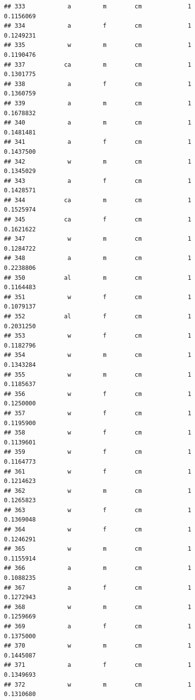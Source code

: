 \documentclass[]{article}
\begin{document}
\begin{verbatim}
## 333            a         m        cm             1          0.1156069
## 334            a         f        cm             1          0.1249231
## 335            w         m        cm             1          0.1190476
## 337           ca         m        cm             1          0.1301775
## 338            a         f        cm             1          0.1360759
## 339            a         m        cm             1          0.1678832
## 340            a         m        cm             1          0.1481481
## 341            a         f        cm             1          0.1437500
## 342            w         m        cm             1          0.1345029
## 343            a         f        cm             1          0.1428571
## 344           ca         m        cm             1          0.1525974
## 345           ca         f        cm             1          0.1621622
## 347            w         m        cm             1          0.1284722
## 348            a         m        cm             1          0.2238806
## 350           al         m        cm             1          0.1164483
## 351            w         f        cm             1          0.1079137
## 352           al         f        cm             1          0.2031250
## 353            w         f        cm             1          0.1182796
## 354            w         m        cm             1          0.1343284
## 355            w         m        cm             1          0.1185637
## 356            w         f        cm             1          0.1250000
## 357            w         f        cm             1          0.1195900
## 358            w         f        cm             1          0.1139601
## 359            w         f        cm             1          0.1164773
## 361            w         f        cm             1          0.1214623
## 362            w         m        cm             1          0.1265823
## 363            w         f        cm             1          0.1369048
## 364            w         f        cm             1          0.1246291
## 365            w         m        cm             1          0.1155914
## 366            a         m        cm             1          0.1088235
## 367            a         f        cm             1          0.1272943
## 368            w         m        cm             1          0.1259669
## 369            a         f        cm             1          0.1375000
## 370            w         m        cm             1          0.1445087
## 371            a         f        cm             1          0.1349693
## 372            w         m        cm             1          0.1310680

\end{verbatim}
\end{document}
